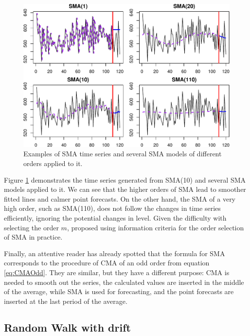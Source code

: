 \documentclass[]{book}
\theoremstyle{definition}
\theoremstyle{definition}
\theoremstyle{definition}
\theoremstyle{definition}
\theoremstyle{remark}
\begin{document}
\begin{figure}
\centering
\includegraphics{Svetunkov--2022----ADAM_files/figure-latex/SMAExample-1.pdf}
\caption{\label{fig:SMAExample}Examples of SMA time series and several SMA models of different orders applied to it.}
\end{figure}

Figure \ref{fig:SMAExample} demonstrates the time series generated from SMA(10) and several SMA models applied to it. We can see that the higher orders of SMA lead to smoother fitted lines and calmer point forecasts. On the other hand, the SMA of a very high order, such as SMA(110), does not follow the changes in time series efficiently, ignoring the potential changes in level. Given the difficulty with selecting the order \(m\), \citet{Svetunkov2017} proposed using information criteria for the order selection of SMA in practice.

Finally, an attentive reader has already spotted that the formula for SMA corresponds to the procedure of CMA of an odd order from equation \eqref{eq:CMAOdd}. They are similar, but they have a different purpose: CMA is needed to smooth out the series, the calculated values are inserted in the middle of the average, while SMA is used for forecasting, and the point forecasts are inserted at the last period of the average.

\hypertarget{RWWithDrift}{%
\subsection{Random Walk with drift}\label{RWWithDrift}}
\end{document}
